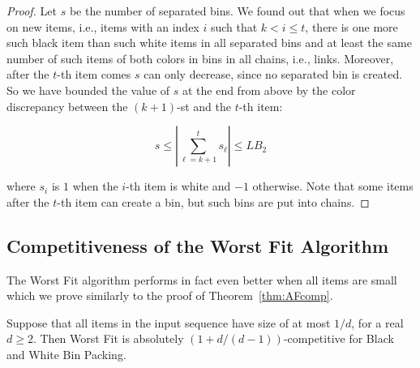 \documentclass[11pt,a4paper]{article}
\def\vari#1{\mathit{#1}}
\begin{document}
\begin{proof}
Let $s$ be the number of separated bins.
We found out that when we focus on new items, i.e., items with an index $i$ such that $k < i \leq t$,
there is one more such black item than such white items in all separated bins
and at least the same number of such items of both colors in bins in all chains, i.e., links.
Moreover, after the $t$-th item comes $s$ can only decrease, since no separated bin is created.
So we have bounded the value of $s$ at the end from above by the color discrepancy between the $(k + 1)$-st and the $t$-th item:

$$s \leq \left| \sum_{\ell=k + 1}^{t} s_\ell \right| \leq \vari{LB_2}$$

where $s_i$ is $1$ when the $i$-th item is white and $-1$ otherwise. 
Note that some items after the $t$-th item can create a bin,
but such bins are put into chains.
\end{proof}

\subsection{Competitiveness of the Worst Fit Algorithm} \label{sec:WF-BWBP}

The Worst Fit algorithm performs in fact even better when all items are small
which we prove similarly to the proof of Theorem~\ref{thm:AFcomp}.

\begin{theorem}
\label{thm:WFparam}
Suppose that all items in the input sequence have size of at most $1/d$,
for a real $d \geq 2$.  Then Worst Fit is absolutely $(1 +
d/(d-1))$-competitive for Black and White Bin Packing.
\end{theorem}	
\end{document}
